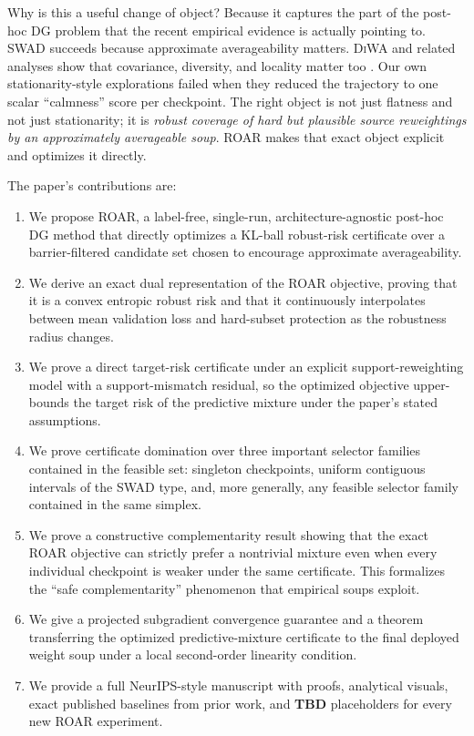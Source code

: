 \documentclass{article}
\newcommand{\TBD}{\textbf{TBD}}
\newcommand{\roar}{\textup{\textsc{ROAR}}}
\newcommand{\swad}{\textup{\textsc{SWAD}}}
\newcommand{\diwa}{\textup{\textsc{DiWA}}}
\begin{document}
Why is this a useful change of object? Because it captures the part of the post-hoc DG problem that the recent empirical evidence is actually pointing to. \swad{} succeeds because approximate averageability matters. \diwa{} and related analyses show that covariance, diversity, and locality matter too \citep{rame2022diwa}. Our own stationarity-style explorations failed when they reduced the trajectory to one scalar ``calmness'' score per checkpoint. The right object is not just flatness and not just stationarity; it is \emph{robust coverage of hard but plausible source reweightings by an approximately averageable soup}. \roar{} makes that exact object explicit and optimizes it directly.

The paper's contributions are:
\begin{enumerate}[leftmargin=1.4em]
    \item We propose \roar{}, a label-free, single-run, architecture-agnostic post-hoc DG method that directly optimizes a KL-ball robust-risk certificate over a barrier-filtered candidate set chosen to encourage approximate averageability.
    \item We derive an exact dual representation of the \roar{} objective, proving that it is a convex entropic robust risk and that it continuously interpolates between mean validation loss and hard-subset protection as the robustness radius changes.
    \item We prove a direct target-risk certificate under an explicit support-reweighting model with a support-mismatch residual, so the optimized objective upper-bounds the target risk of the predictive mixture under the paper's stated assumptions.
    \item We prove certificate domination over three important selector families contained in the feasible set: singleton checkpoints, uniform contiguous intervals of the \swad{} type, and, more generally, any feasible selector family contained in the same simplex.
    \item We prove a constructive complementarity result showing that the exact \roar{} objective can strictly prefer a nontrivial mixture even when every individual checkpoint is weaker under the same certificate. This formalizes the ``safe complementarity'' phenomenon that empirical soups exploit.
    \item We give a projected subgradient convergence guarantee and a theorem transferring the optimized predictive-mixture certificate to the final deployed weight soup under a local second-order linearity condition.
    \item We provide a full NeurIPS-style manuscript with proofs, analytical visuals, exact published baselines from prior work, and \TBD{} placeholders for every new \roar{} experiment.
\end{enumerate}
\end{document}
